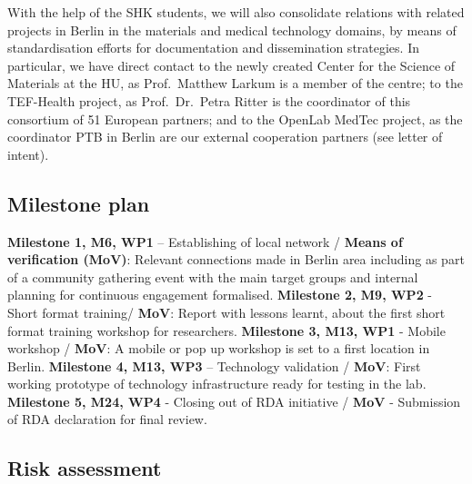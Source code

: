 \documentclass[
  12pt,
  a4paper,
]{article}
\begin{document}
With the help of the SHK students, we will also consolidate relations
with related projects in Berlin in the materials and medical technology
domains, by means of standardisation efforts for documentation and
dissemination strategies. In particular, we have direct contact to the
newly created Center for the Science of Materials at the HU, as
Prof.~Matthew Larkum is a member of the centre; to the TEF-Health
project, as Prof.~Dr.~Petra Ritter is the coordinator of this consortium
of 51 European partners; and to the OpenLab MedTec project, as the
coordinator PTB in Berlin are our external cooperation partners (see
letter of intent).

\hypertarget{milestone-plan}{%
\subsection{Milestone plan}\label{milestone-plan}}

\textbf{Milestone 1, M6, WP1} -- Establishing of local network /
\textbf{Means of verification (MoV)}: Relevant connections made in
Berlin area including as part of a community gathering event with the
main target groups and internal planning for continuous engagement
formalised. \textbf{Milestone 2, M9, WP2} - Short format training/
\textbf{MoV}: Report with lessons learnt, about the first short format
training workshop for researchers. \textbf{Milestone 3, M13, WP1} -
Mobile workshop / \textbf{MoV}: A mobile or pop up workshop is set to a
first location in Berlin. \textbf{Milestone 4, M13, WP3} -- Technology
validation / \textbf{MoV}: First working prototype of technology
infrastructure ready for testing in the lab. \textbf{Milestone 5, M24,
WP4} - Closing out of RDA initiative / \textbf{MoV} - Submission of RDA
declaration for final review.

\hypertarget{risk-assessment}{%
\subsection{Risk assessment}\label{risk-assessment}}
\end{document}
